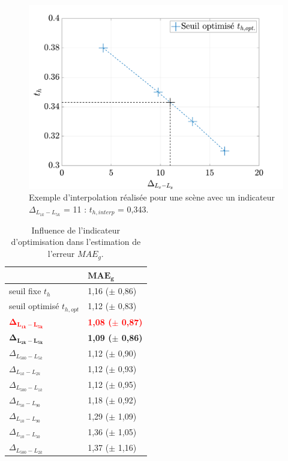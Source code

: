 \begin{figure}[h]
\centering
\includegraphics[width=.7\linewidth]{./figures/resultats/interpolationOpt.pdf}
\caption{Exemple d'interpolation réalisée pour une scène avec un indicateur $\Delta_{L_{1k}-L_{5k}}$ = 11 : $t_{h,interp}$ = 0,343.}
\label{fig:interpolation}
\end{figure}

\begin{table}[h]
\centering
\caption{Influence de l'indicateur d'optimisation dans l'estimation de l'erreur $MAE_{g}$.}
\label{tab:result_opt}
\begin{tabular}{L{4cm}C{2.5cm}}
\toprule
 & $\mathbf{MAE_g}$    \\
 \midrule
seuil fixe $t_h$ & 1,16 ($\pm$ 0,86)  \\
seuil optimisé $t_{h,opt}$ & 1,12 ($\pm$ 0,83) \\
\midrule
\textcolor{red}{$\mathbf{\Delta_{L_{1k}-L_{5k}}}$} & \textbf{\textcolor{red}{1,08 ($\pm$ 0,87)}}\\
$\mathbf{\Delta_{L_{2k}-L_{5k}}}$& \textbf{1,09 ($\pm$ 0,86)}\\
$\Delta_{L_{500}-L_{5k}}$ & 1,12 ($\pm$ 0,90)\\
$\Delta_{L_{1k}-L_{2k}}$ & 1,12 ($\pm$ 0,93)\\
$\Delta_{L_{500}-L_{1k}}$ & 1,12 ($\pm$ 0,95)\\
$\Delta_{L_{50}-L_{90}}$ & 1,18 ($\pm$ 0,92)\\
$\Delta_{L_{10}-L_{90}}$ & 1,29 ($\pm$ 1,09)\\
$\Delta_{L_{10}-L_{50}}$ & 1,36 ($\pm$ 1,05)\\
$\Delta_{L_{500}-L_{2k}}$ & 1,37 ($\pm$ 1,16)\\
\bottomrule
\end{tabular}
\end{table}

